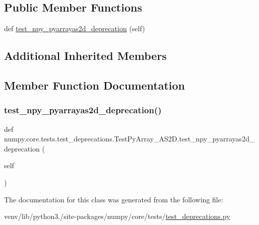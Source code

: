 \subsection*{Public Member Functions}
\begin{DoxyCompactItemize}
\item 
def \hyperlink{classnumpy_1_1core_1_1tests_1_1test__deprecations_1_1TestPyArray__AS2D_aaa2eb6d0b6e1166801597e90825f1df4}{test\+\_\+npy\+\_\+pyarrayas2d\+\_\+deprecation} (self)
\end{DoxyCompactItemize}
\subsection*{Additional Inherited Members}


\subsection{Member Function Documentation}
\mbox{\label{classnumpy_1_1core_1_1tests_1_1test__deprecations_1_1TestPyArray__AS2D_aaa2eb6d0b6e1166801597e90825f1df4}} 
\subsubsection{\texorpdfstring{test\+\_\+npy\+\_\+pyarrayas2d\+\_\+deprecation()}{test\_npy\_pyarrayas2d\_deprecation()}}
{\footnotesize\ttfamily def numpy.\+core.\+tests.\+test\+\_\+deprecations.\+Test\+Py\+Array\+\_\+\+A\+S2\+D.\+test\+\_\+npy\+\_\+pyarrayas2d\+\_\+deprecation (\begin{DoxyParamCaption}\item[{}]{self }\end{DoxyParamCaption})}



The documentation for this class was generated from the following file\+:\begin{DoxyCompactItemize}
\item 
venv/lib/python3./site-\/packages/numpy/core/tests/\hyperlink{core_2tests_2test__deprecations_8py}{test\+\_\+deprecations.\+py}\end{DoxyCompactItemize}
